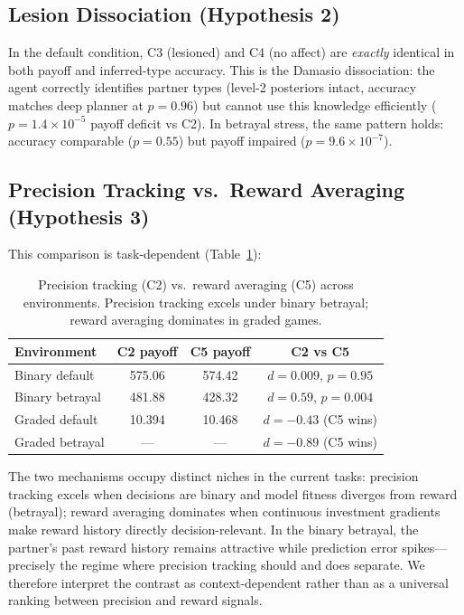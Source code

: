 \documentclass[11pt,a4paper]{article}
\begin{document}
\subsection{Lesion Dissociation (Hypothesis 2)}

In the default condition, C3 (lesioned) and C4 (no affect) are \emph{exactly} identical in both payoff and inferred-type accuracy. This is the Damasio dissociation: the agent correctly identifies partner types (level-2 posteriors intact, accuracy matches deep planner at $p = 0.96$) but cannot use this knowledge efficiently ($p = 1.4 \times 10^{-5}$ payoff deficit vs C2). In betrayal stress, the same pattern holds: accuracy comparable ($p = 0.55$) but payoff impaired ($p = 9.6 \times 10^{-7}$).

\subsection{Precision Tracking vs.\ Reward Averaging (Hypothesis 3)}

This comparison is task-dependent (Table~\ref{tab:h3}):

\begin{table}[ht]
\centering\small
\begin{tabular}{lccc}
\toprule
Environment & C2 payoff & C5 payoff & C2 vs C5 \\
\midrule
Binary default & 575.06 & 574.42 & $d = 0.009$, $p = 0.95$ \\
Binary betrayal & 481.88 & 428.32 & $d = 0.59$, $p = 0.004$ \\
Graded default & 10.394 & 10.468 & $d = -0.43$ (C5 wins) \\
Graded betrayal & --- & --- & $d = -0.89$ (C5 wins) \\
\bottomrule
\end{tabular}
\caption{Precision tracking (C2) vs.\ reward averaging (C5) across environments. Precision tracking excels under binary betrayal; reward averaging dominates in graded games.}
\label{tab:h3}
\end{table}

The two mechanisms occupy distinct niches in the current tasks: precision tracking excels when decisions are binary and model fitness diverges from reward (betrayal); reward averaging dominates when continuous investment gradients make reward history directly decision-relevant. In the binary betrayal, the partner's past reward history remains attractive while prediction error spikes---precisely the regime where precision tracking should and does separate. We therefore interpret the contrast as context-dependent rather than as a universal ranking between precision and reward signals.
\end{document}
